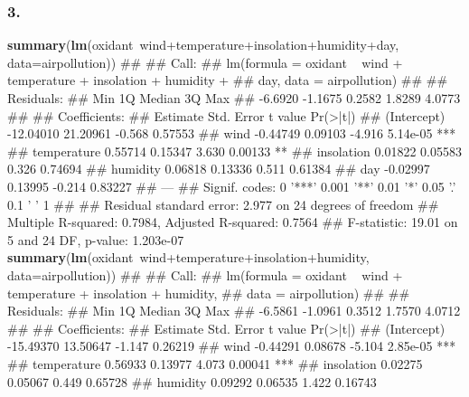 \documentclass[11pt,]{article}
\newenvironment{Shaded}{\begin{snugshade}}{\end{snugshade}}
\newcommand{\KeywordTok}[1]{\textcolor[rgb]{0.13,0.29,0.53}{\textbf{{#1}}}}
\newcommand{\DataTypeTok}[1]{\textcolor[rgb]{0.13,0.29,0.53}{{#1}}}
\newcommand{\NormalTok}[1]{{#1}}
\begin{document}
\subsubsection{3.}\label{section-26}

\begin{Shaded}
\begin{Highlighting}[]
\KeywordTok{summary}\NormalTok{(}\KeywordTok{lm}\NormalTok{(oxidant~wind+temperature+insolation+humidity+day, }\DataTypeTok{data=}\NormalTok{airpollution))}
\NormalTok{## }
\NormalTok{## Call:}
\NormalTok{## lm(formula = oxidant ~ wind + temperature + insolation + humidity + }
\NormalTok{##     day, data = airpollution)}
\NormalTok{## }
\NormalTok{## Residuals:}
\NormalTok{##     Min      1Q  Median      3Q     Max }
\NormalTok{## -6.6920 -1.1675  0.2582  1.8289  4.0773 }
\NormalTok{## }
\NormalTok{## Coefficients:}
\NormalTok{##              Estimate Std. Error t value Pr(>|t|)    }
\NormalTok{## (Intercept) -12.04010   21.20961  -0.568  0.57553    }
\NormalTok{## wind         -0.44749    0.09103  -4.916 5.14e-05 ***}
\NormalTok{## temperature   0.55714    0.15347   3.630  0.00133 ** }
\NormalTok{## insolation    0.01822    0.05583   0.326  0.74694    }
\NormalTok{## humidity      0.06818    0.13336   0.511  0.61384    }
\NormalTok{## day          -0.02997    0.13995  -0.214  0.83227    }
\NormalTok{## ---}
\NormalTok{## Signif. codes:  0 '***' 0.001 '**' 0.01 '*' 0.05 '.' 0.1 ' ' 1}
\NormalTok{## }
\NormalTok{## Residual standard error: 2.977 on 24 degrees of freedom}
\NormalTok{## Multiple R-squared:  0.7984, Adjusted R-squared:  0.7564 }
\NormalTok{## F-statistic: 19.01 on 5 and 24 DF,  p-value: 1.203e-07}
\KeywordTok{summary}\NormalTok{(}\KeywordTok{lm}\NormalTok{(oxidant~wind+temperature+insolation+humidity, }\DataTypeTok{data=}\NormalTok{airpollution))}
\NormalTok{## }
\NormalTok{## Call:}
\NormalTok{## lm(formula = oxidant ~ wind + temperature + insolation + humidity, }
\NormalTok{##     data = airpollution)}
\NormalTok{## }
\NormalTok{## Residuals:}
\NormalTok{##     Min      1Q  Median      3Q     Max }
\NormalTok{## -6.5861 -1.0961  0.3512  1.7570  4.0712 }
\NormalTok{## }
\NormalTok{## Coefficients:}
\NormalTok{##              Estimate Std. Error t value Pr(>|t|)    }
\NormalTok{## (Intercept) -15.49370   13.50647  -1.147  0.26219    }
\NormalTok{## wind         -0.44291    0.08678  -5.104 2.85e-05 ***}
\NormalTok{## temperature   0.56933    0.13977   4.073  0.00041 ***}
\NormalTok{## insolation    0.02275    0.05067   0.449  0.65728    }
\NormalTok{## humidity      0.09292    0.06535   1.422  0.16743    }

\end{Highlighting}
\end{Shaded}
\end{document}
